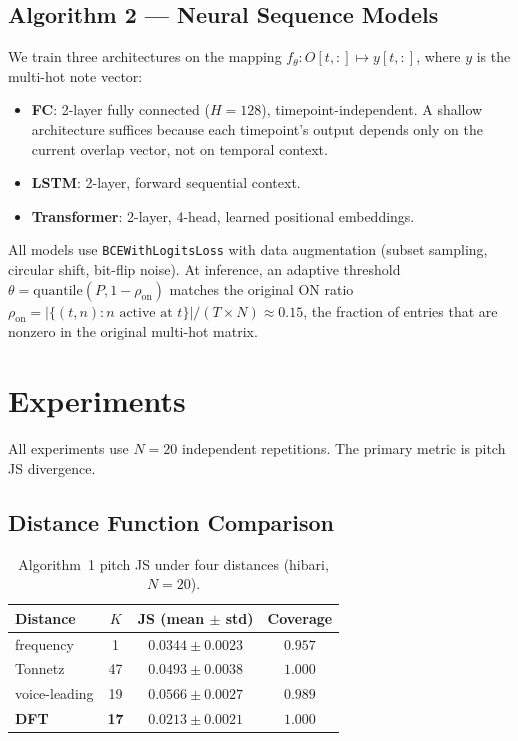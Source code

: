 \documentclass[conference,10pt,a4paper]{IEEEtran}
\begin{document}
\subsection{Algorithm 2 --- Neural Sequence Models}
\label{subsec:algo2}

We train three architectures on the mapping
$f_\theta : O[t,:] \mapsto y[t,:]$, where $y$ is the multi-hot note
vector:
\begin{itemize}[nosep]
\item \textbf{FC}: 2-layer fully connected ($H = 128$), timepoint-independent.
      A shallow architecture suffices because each timepoint's output
      depends only on the current overlap vector, not on temporal context.
\item \textbf{LSTM}: 2-layer, forward sequential context.
\item \textbf{Transformer}: 2-layer, 4-head, learned positional embeddings.
\end{itemize}

All models use \texttt{BCEWithLogitsLoss} with data augmentation
(subset sampling, circular shift, bit-flip noise).  At inference,
an adaptive threshold
$\theta = \mathrm{quantile}(P, 1-\rho_{\mathrm{on}})$ matches the
original ON ratio $\rho_{\mathrm{on}} = |\{(t,n): n \text{ active at } t\}| / (T \times N) \approx 0.15$,
the fraction of entries that are nonzero in the original multi-hot matrix.


\section{Experiments}
\label{sec:experiments}

All experiments use $N = 20$ independent repetitions.  The primary
metric is pitch JS divergence.

\subsection{Distance Function Comparison}
\label{subsec:dist_compare}

\begin{table}[t]
\centering
\caption{Algorithm~1 pitch JS under four distances (hibari, $N=20$).}
\label{tab:baselines}
\begin{tabular}{lccc}
\toprule
Distance & $K$ & JS (mean $\pm$ std) & Coverage \\
\midrule
frequency      & 1  & $0.0344 \pm 0.0023$ & $0.957$ \\
Tonnetz        & 47 & $0.0493 \pm 0.0038$ & $1.000$ \\
voice-leading  & 19 & $0.0566 \pm 0.0027$ & $0.989$ \\
\textbf{DFT}   & \textbf{17} & $\mathbf{0.0213 \pm 0.0021}$ & $1.000$ \\
\bottomrule
\end{tabular}
\end{table}
\end{document}
